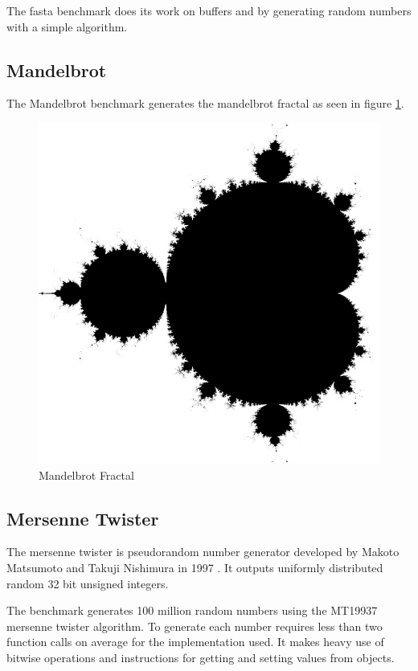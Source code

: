 \documentclass[english,a4paper]{report}
\begin{document}
The fasta benchmark does its work on buffers and by generating random
numbers with a simple algorithm.

\subsection{Mandelbrot}

The Mandelbrot benchmark generates the mandelbrot fractal as seen in
figure \ref{fig:mandel}.

\begin{figure}
  \centering
  \includegraphics[scale=0.015]{mandelbrot.jpg}
  \caption{Mandelbrot Fractal}
  \label{fig:mandel}
\end{figure}

\subsection{Mersenne Twister}
The mersenne twister is pseudorandom number generator developed by
Makoto Matsumoto and Takuji Nishimura in 1997 \cite{Matsumoto}. It
outputs uniformly distributed random 32 bit unsigned integers.

The benchmark generates 100 million random numbers using the MT19937
mersenne twister algorithm. To generate each number requires less than
two function calls on average for the implementation used. It makes
heavy use of bitwise operations and instructions for getting and
setting values from objects.
\end{document}
